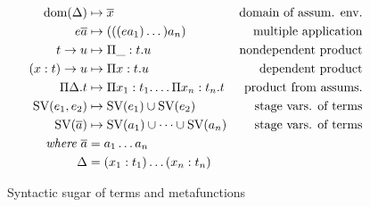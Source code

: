 \begin{figure}
\begin{align*}
\text{dom}(\Delta)        &\mapsto \overline{x}                           &\text{domain of assum. env.} \\
e \overline{a}      &\mapsto (((e a_1) \dots) a_n)                  &\text{multiple application} \\
t \to u             &\mapsto \Pi\_: t. u                            &\text{nondependent product} \\
(x: t) \to u        &\mapsto \Pi x: t. u                            &\text{dependent product} \\
\Pi\Delta.t         &\mapsto \Pi x_1: t_1. \dots \Pi x_n: t_n. t    &\text{product from assums.} \\
\text{SV}(e_1, e_2)       &\mapsto \text{SV}(e_1) \cup \text{SV}(e_2)                 &\text{stage vars. of terms} \\
\text{SV}(\overline{a})   &\mapsto \text{SV}(a_1) \cup \dots \cup \text{SV}(a_n)      &\text{stage vars. of terms} \\
\textit{where}\ \overline{a} &= a_1 \dots a_n \\
\Delta  &= (x_1: t_1) \dots (x_n: t_n)
\end{align*}
\caption{Syntactic sugar of terms and metafunctions}
\label{fig:sugar}
\end{figure}